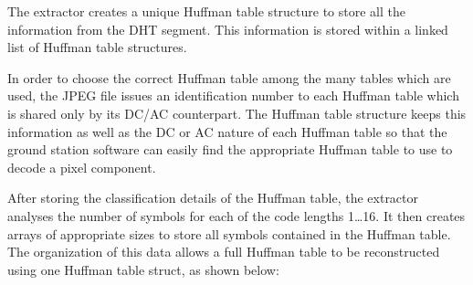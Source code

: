 The extractor creates a unique Huffman table structure to
store all the information from the DHT segment. This information
is stored within a linked list of Huffman table structures.

In order to choose the correct Huffman table among the many
tables which are used, the JPEG file issues an identification number
to each Huffman table which is shared only by its DC/AC counterpart.
The Huffman table structure keeps this information as well as the
DC or AC nature of each Huffman table so that the ground station
software can easily find the appropriate Huffman table to use to
decode a pixel component.

After storing the classification details of the Huffman table,
the extractor analyses the number of symbols for each
of the code lengths 1\ldots16. It then creates arrays
of appropriate sizes to store all symbols contained in 
the Huffman table. The organization of this data allows
a full Huffman table to be reconstructed using one
Huffman table struct, as shown below:

